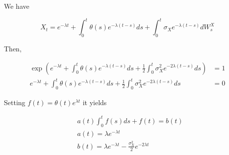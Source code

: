 \documentclass{article}
\begin{document}
\noindent We have 

\begin{equation}
	X_t = e^{-\lambda t} + \int_{0}^t \theta(s) e^{-\lambda (t-s)} ds + \int_0^t \sigma_X e^{-\lambda(t-s)} dW_s^X
\end{equation}

\noindent Then,

\begin{equation}
\begin{aligned}
	\exp\left(e^{-\lambda t} + \int_{0}^t \theta(s) e^{-\lambda (t-s)} ds + \frac{1}{2}\int_0^t \sigma_X^2 e^{-2\lambda(t-s)} ds\right) &= 1\\
	e^{-\lambda t} + \int_{0}^t \theta(s) e^{-\lambda (t-s)} ds + \frac{1}{2}\int_0^t \sigma_X^2 e^{-2\lambda(t-s)} ds &= 0
\end{aligned}
\end{equation}

Setting $f(t) = \theta(t) e^{\lambda t}$ it yields

\begin{equation}
\begin{aligned}
	&a(t) \int_0^t f(s) ds + f(t) = b(t)\\
	&a(t)  = \lambda e^{-\lambda t}\\
	&b(t) = \lambda e^{-\lambda t} - \frac{\sigma_X^2}{2} e^{-2\lambda t}
\end{aligned}
\end{equation}
\end{document}
